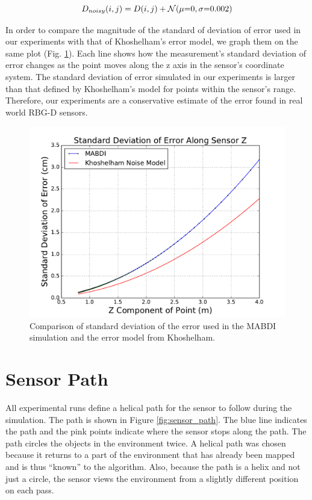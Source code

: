 \begin{equation}
  D_{noisy}(i,j) = D(i,j) + \mathcal{N} (\mu\mathsmaller{=}0, \sigma\mathsmaller{=}0.002)
  \label{eqn:depth_noise}
\end{equation}

In order to compare the magnitude of the standard of deviation of error used in
our experiments with that of Khoshelham's error model, we graph them on the same
plot (Fig. \ref{fig:depth_noise_error}). Each line shows how the measurement's
standard deviation of error changes as the point moves along the z axis in the
sensor's coordinate system. The standard deviation of error simulated in our
experiments is larger than that defined by Khoshelham's model for points within
the sensor's range. Therefore, our experiments are a conservative estimate of
the error found in real world RBG-D sensors.

\begin{figure}[h]%
\centering
  \includegraphics[width=.70\textwidth]{figures/expsetup_noise_error.pdf}
  \caption{Comparison of standard deviation of the error used in the MABDI simulation and the error model from Khoshelham.}
  \label{fig:depth_noise_error}
\end{figure}

\section{Sensor Path}

All experimental runs define a helical path for the sensor to follow during the
simulation. The path is shown in Figure \ref{fig:sensor_path}. The blue line
indicates the path and the pink points indicate where the sensor stops along the
path. The path circles the objects in the environment twice. A helical path was
chosen because it returns to a part of the environment that has already been
mapped and is thus ``known'' to the algorithm. Also, because the path is a
helix and not just a circle, the sensor views the environment from a slightly
different position on each pass.

